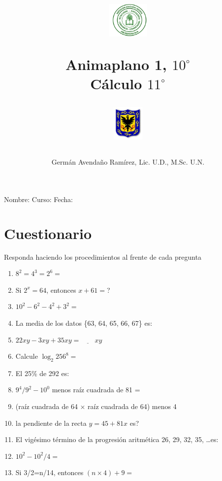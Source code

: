 \documentclass[10pt,twoside]{article}
\author{Germ\'an Avenda\~no Ram\'irez, Lic. U.D., M.Sc. U.N.}
\title{\begin{minipage}{.2\textwidth}
\includegraphics[height=1.75cm]{Images/logo-colegio.png}\end{minipage}
\begin{minipage}{.55\textwidth}
\begin{center}
Animaplano 1, $10^{\circ}$  \\
Cálculo $11^{\circ}$
\end{center}
\end{minipage}\hfill
\begin{minipage}{.2\textwidth}
\includegraphics[height=1.75cm]{Images/logo-sed.png} 
\end{minipage}}
\date{}
\begin{document}
\maketitle
Nombre: \hrulefill Curso: \underline{\hspace*{44pt}} Fecha: \underline{\hspace*{2.5cm}}
\section*{Cuestionario}
Responda haciendo los procedimientos al frente de cada pregunta
\begin{enumerate}
 \item $8^{2}=4^{3}=2^{6}=$
 \item Si $2^{x}=64$, entonces $x+61=$?
 \item $10^{2}-6^{2}-4^{2}+3^{2}=$
 \item La media de los datos \{63, 64, 65, 66, 67\} es:
 \item $22xy-3xy+35xy=\underline{\hspace{24pt}}xy$
 \item Calcule $\log_{2}256^{8}=$
 \item El 25\% de 292 es:
 \item $9^{4}/9^{2}-10^{0}$ menos raíz cuadrada de 81 =
 \item (raíz cuadrada de 64 $\times$ raíz cuadrada de 64) menos 4
 \item la pendiente de la recta $y=45+81x$ es?
 \item El vigésimo término de la progresión aritmética 26, 29, 32, 35, \dots es:
 \item $10^{2}-10^{2}/4=$
 \item Si 3/2=n/14, entonces $(n\times4)+9=$
\end{enumerate}
\end{document}
